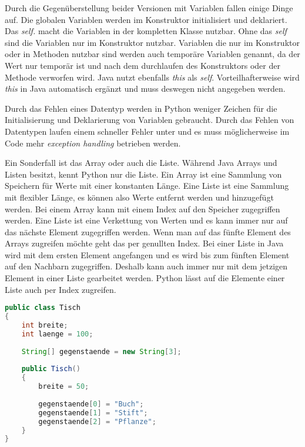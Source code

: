 Durch die Gegenüberstellung beider Versionen mit Variablen fallen einige Dinge auf. Die globalen Variablen werden im Konstruktor initialisiert und deklariert. Das \textit{self.} macht die Variablen in der kompletten Klasse nutzbar. Ohne das \textit{self} sind die Variablen nur im Konstruktor nutzbar. Variablen die nur im Konstruktor oder in Methoden nutzbar sind werden auch temporäre Variablen genannt, da der Wert nur temporär ist und nach dem durchlaufen des Konstruktors oder der Methode verworfen wird. Java nutzt ebenfalls \textit{this} als \textit{self}. Vorteilhafterweise wird \textit{this} in Java automatisch ergänzt und muss deswegen nicht angegeben werden. 
\par
Durch das Fehlen eines Datentyp werden in Python weniger Zeichen für die Initialisierung und Deklarierung von Variablen gebraucht. Durch das Fehlen von Datentypen laufen einem schneller Fehler unter und es muss möglicherweise im Code mehr \textit{exception handling} betrieben werden.
\par
Ein Sonderfall ist das Array oder auch die Liste. Während Java Arrays und Listen besitzt, kennt Python nur die Liste. Ein Array ist eine Sammlung von Speichern für Werte mit einer konstanten Länge. Eine Liste ist eine Sammlung mit flexibler Länge, es können also Werte entfernt werden und hinzugefügt werden. Bei einem Array kann mit einem Index auf den Speicher zugegriffen werden. Eine Liste ist eine Verkettung von Werten und es kann immer nur auf das nächste Element zugegriffen werden. Wenn man auf das fünfte Element des Arrays zugreifen möchte geht das per genullten Index. Bei einer Liste in Java wird mit dem ersten Element angefangen und es wird bis zum fünften Element auf den Nachbarn zugegriffen. Deshalb kann auch immer nur mit dem jetzigen Element in einer Liste gearbeitet werden. Python lässt auf die Elemente einer Liste auch per Index zugreifen. \cite{NRWListe}\cite{Louis:2010}\cite{Python3:Buch}

\begin{lstlisting}[language=java,caption={Array in Java},captionpos=b,label={lst:java:array},frame=none]
public class Tisch
{
    int breite;
    int laenge = 100;
  
    String[] gegenstaende = new String[3];
  
    public Tisch()
    {
        breite = 50;
    
        gegenstaende[0] = "Buch";
        gegenstaende[1] = "Stift";
        gegenstaende[2] = "Pflanze";
    }
}
\end{lstlisting}

